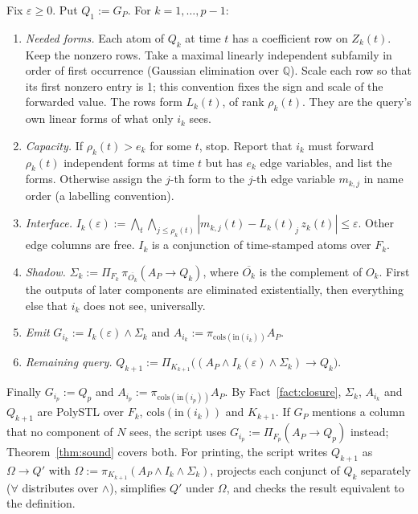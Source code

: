 \documentclass[11pt]{article}
\makeatletter
\renewcommand\paragraph{\@startsection{paragraph}{4}{\z@}{1.2ex plus .5ex minus .2ex}{-1em}{\normalfont\normalsize\bfseries}}
\theoremstyle{definition}
\theoremstyle{remark}
\newcommand{\cols}{\mathrm{cols}}
\newcommand{\inp}{\mathrm{in}}
\newcommand{\eps}{\varepsilon}
\newcommand{\Q}{\mathbb{Q}}
\makeatother
\begin{document}
\paragraph{Recursion.}
Fix $\eps\ge0$. Put $Q_1:=G_P$. For $k=1,\dots,p-1$:
\begin{enumerate}[label=(\alph*)]
\item \emph{Needed forms.} Each atom of $Q_k$ at time $t$ has a coefficient row on $Z_k(t)$.
Keep the nonzero rows. Take a maximal linearly independent subfamily in order of first occurrence (Gaussian elimination over $\Q$).
Scale each row so that its first nonzero entry is 1; this convention fixes the sign and scale of the forwarded value.
The rows form $L_k(t)$, of rank $\rho_k(t)$. They are the query's own linear forms of what only $i_k$ sees.
\item \emph{Capacity.} If $\rho_k(t)>e_k$ for some $t$, stop. Report that $i_k$ must forward $\rho_k(t)$ independent forms at time $t$ but has $e_k$ edge variables, and list the forms.
Otherwise assign the $j$-th form to the $j$-th edge variable $m_{k,j}$ in name order (a labelling convention).
\item \emph{Interface.} $I_k(\eps):=\bigwedge_t\bigwedge_{j\le\rho_k(t)}|m_{k,j}(t)-L_k(t)_j\,z_k(t)|\le\eps$. Other edge columns are free.
$I_k$ is a conjunction of time-stamped atoms over $F_k$.
\item \emph{Shadow.} $\Sigma_k:=\Pi_{F_k}\,\pi_{\overline{O_k}}(A_P\to Q_k)$, where $\overline{O_k}$ is the complement of $O_k$.
First the outputs of later components are eliminated existentially, then everything else that $i_k$ does not see, universally.
\item \emph{Emit} $G_{i_k}:=I_k(\eps)\wedge\Sigma_k$ and $A_{i_k}:=\pi_{\cols(\inp(i_k))}A_P$.
\item \emph{Remaining query.} $Q_{k+1}:=\Pi_{K_{k+1}}\big((A_P\wedge I_k(\eps)\wedge\Sigma_k)\to Q_k\big)$.
\end{enumerate}
Finally $G_{i_p}:=Q_p$ and $A_{i_p}:=\pi_{\cols(\inp(i_p))}A_P$.
By Fact~\ref{fact:closure}, $\Sigma_k$, $A_{i_k}$ and $Q_{k+1}$ are PolySTL over $F_k$, $\cols(\inp(i_k))$ and $K_{k+1}$.
If $G_P$ mentions a column that no component of $N$ sees, the script uses $G_{i_p}:=\Pi_{F_p}(A_P\to Q_p)$ instead; Theorem~\ref{thm:sound} covers both.
For printing, the script writes $Q_{k+1}$ as $\Omega\to Q'$ with $\Omega:=\pi_{K_{k+1}}(A_P\wedge I_k\wedge\Sigma_k)$, projects each conjunct of $Q_k$ separately ($\forall$ distributes over $\wedge$), simplifies $Q'$ under $\Omega$, and checks the result equivalent to the definition.
\end{document}
